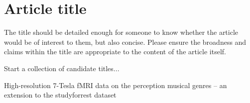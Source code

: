 \section*{Article title}
The title should be detailed enough for someone to know whether the article would be of interest to them, but also concise. Please ensure the broadness and claims within the title are appropriate to the content of the article itself.

Start a collection of candidate titles...

High-resolution 7-Tesla fMRI data on the perception musical genres -- an extension to the studyforrest dataset